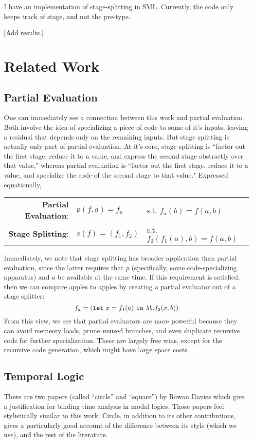 \documentclass[11pt]{article}
\newcommand {\letin} [3] {{\tt let}~{#1} = {#2}~{\tt in}~{#3}}
\begin{document}
I have an implementation of stage-splitting in SML.  Currently, the code only keeps track of stage, and not the pre-type.

[Add results.]

\section{Related Work}
\label{sec:lit}
\subsection{Partial Evaluation}
One can immediately see a connection between this work and partial evaluation. Both involve the idea of specializing a piece of code to some of it's inputs, leaving a residual that depends only on the remaining inputs.  But stage splitting is actually only part of partial evaluation.  At it's core, stage splitting is ``factor out the first stage, reduce it to a value, and express the second stage abstractly over that value," whereas partial evaluation is ``factor out the first stage, reduce it to a value, and specialize the code of the second stage to that value."  Expressed equationally,
\begin{center}
\begin{tabular}{rll}
{\bf Partial Evaluation}:& $p(f,a)=f_a$ &s.t. $f_a(b) = f(a,b)$ \\
{\bf Stage Splitting}:& $s(f)=(f_1,f_2)$ &s.t. $f_2(f_1(a),b) = f(a,b)$
\end{tabular}
\end{center}
Immediately, we note that stage splitting has broader application than partial evaluation, since the latter requires that $p$ (specifically, some code-specializing apparatus) and $a$ be available at the same time.  If this requirement is satisfied, then we can compare apples to apples by creating a partial evaluator out of a stage splitter:
	\[f_a = (\letin {x}{f_1(a)}{\lambda b.f_2(x,b)})\]
From this view, we see that partial evaluators are more powerful because they can avoid memeory loads, prune unused branches, and even duplicate recursive code for further specialization.  These are largely free wins, except for the recursive code generation, which might have large space costs.

\subsection{Temporal Logic}

There are two papers (called ``circle'' and ``square'') by Rowan Davies which give a justification for binding time analysis in modal logics.  Those papers feel stylistically similar to this work.  Circle, in addition to its other contributions, gives a particularly good account of the difference between its style (which we use), and the rest of the literature. 
\end{document}
